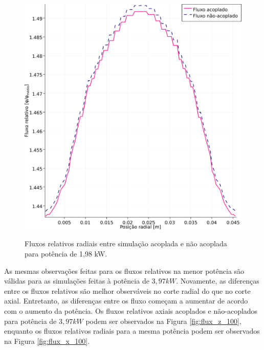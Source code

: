 \begin{figure}[htb]
  \caption{Fluxos relativos radiais entre simulação acoplada e não acoplada para
    potência de 1,98 kW.}
  \centering\includegraphics[scale=0.7]{figuras/Flux_rel_x_50_port.png}
  \label{fig:flux_x_50}
\end{figure}

As mesmas observações feitas para os fluxos relativos na menor potência são válidas
para as simulações feitas à potência de $3,97 kW$. Novamente, as diferenças entre
os fluxos relativos são melhor observáveis no corte radial do que no corte axial.
Entretanto, as diferenças entre os fluxo começam a aumentar de acordo com o
aumento da potência. Os fluxos relativos axiais acoplados e não-acoplados para
potência de $3,97 kW$ podem ser observados na Figura \ref{fig:flux_z_100}, enquanto
os fluxos relativos radiais para a mesma potência podem ser observados na Figura \ref{fig:flux_x_100}.

